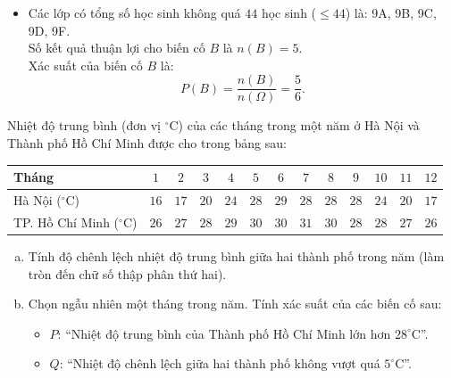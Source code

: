\begin{bt}
{\begin{enumerate}[a)]
\begin{itemize}
        Số kết quả thuận lợi cho biến cố $A$ là $n(A) = 4$.\\
        Xác suất của biến cố $A$ là:
        $$P(A) = \dfrac{n(A)}{n(\Omega)} = \dfrac{4}{6} = \dfrac{2}{3}.$$
        \item Các lớp có tổng số học sinh không quá $44$ học sinh ($\le 44$) là: 9A, 9B, 9C, 9D, 9F.\\
        Số kết quả thuận lợi cho biến cố $B$ là $n(B) = 5$.\\
        Xác suất của biến cố $B$ là:
        $$P(B) = \dfrac{n(B)}{n(\Omega)} = \dfrac{5}{6}.$$
    \end{itemize}
\end{enumerate}
}
\end{bt}


\begin{bt}%
Nhiệt độ trung bình (đơn vị $^\circ\text{C}$) của các tháng trong một năm ở Hà Nội và Thành phố Hồ Chí Minh được cho trong bảng sau:
\begin{center}
\begin{tabular}{|l|c|c|c|c|c|c|c|c|c|c|c|c|}
\hline
\textbf{Tháng} & $1$ & $2$ & $3$ & $4$ & $5$ & $6$ & $7$ & $8$ & $9$ & $10$ & $11$ & $12$ \\ \hline
Hà Nội ($^\circ\text{C}$) & $16$ & $17$ & $20$ & $24$ & $28$ & $29$ & $28$ & $28$ & $28$ & $24$ & $20$ & $17$ \\ \hline
TP. Hồ Chí Minh ($^\circ\text{C}$) & $26$ & $27$ & $28$ & $29$ & $30$ & $30$ & $31$ & $30$ & $28$ & $28$ & $27$ & $26$ \\ \hline
\end{tabular}
\end{center}
\begin{enumerate}[a)]
    \item Tính độ chênh lệch nhiệt độ trung bình giữa hai thành phố trong năm (làm tròn đến chữ số thập phân thứ hai).
    \item Chọn ngẫu nhiên một tháng trong năm. Tính xác suất của các biến cố sau:
    \begin{itemize}
        \item $P$: ``Nhiệt độ trung bình của Thành phố Hồ Chí Minh lớn hơn $28^\circ\text{C}$''.
        \item $Q$: ``Nhiệt độ chênh lệch giữa hai thành phố không vượt quá $5^\circ\text{C}$''.
    \end{itemize}
\end{enumerate}

\end{bt}
